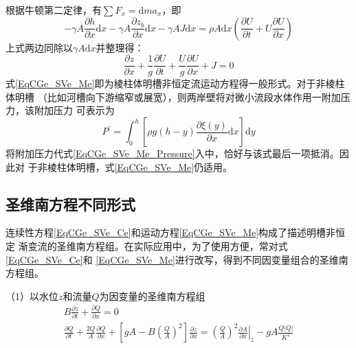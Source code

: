 根据牛顿第二定律，有$\sum F_{x}=\mathrm{d}ma_{x}$，即
\begin{equation}
  -\gamma A\frac{\partial h}{\partial x}\mathrm{d}x
  -\gamma A\frac{\partial z_{b}}{\partial x}\mathrm{d}x
  -\gamma AJ\mathrm{d}x
  =
  \rho A\mathrm{d}x
  \left(
  \frac{\partial U}{\partial t}
  +
  U
  \frac{\partial U}{\partial x}
  \right)
\end{equation}
上式两边同除以$\gamma A\mathrm{d}x$并整理得：
\begin{equation}
  \frac{\partial z}{\partial x}
  +
  \frac{1}{g}
  \frac{\partial U}{\partial t}
  +
  \frac{U}{g}
  \frac{\partial U}{\partial x}
  +
  J
  =
  0
  \label{EqCGe_SVe_Me}
\end{equation}
式\eqref{EqCGe_SVe_Me}即为棱柱体明槽非恒定流运动方程得一般形式。对于非棱柱体明槽
（比如河槽向下游缩窄或展宽），则两岸壁将对微小流段水体作用一附加压力，该附加压力
可表示为
\begin{equation}
  P^{\prime}
  =
  \int_{0}^{h}\!
  \left[
    \rho g(h-y)
    \frac{\partial \xi(y)}{\partial x}
    \mathrm{d}x
  \right]
  \mathrm{d}y
\end{equation}
将附加压力代式\eqref{EqCGe_SVe_Me_Pressure}入中，恰好与该式最后一项抵消。因此对
于非棱柱体明槽，式\eqref{EqCGe_SVe_Me}仍适用。

\subsection{圣维南方程不同形式}
连续性方程\eqref{EqCGe_SVe_Ce}和运动方程\eqref{EqCGe_SVe_Me}构成了描述明槽非恒定
渐变流的圣维南方程组。在实际应用中，为了使用方便，常对式\eqref{EqCGe_SVe_Ce}和
\eqref{EqCGe_SVe_Me}进行改写，得到不同因变量组合的圣维南方程组。


（1）以水位$z$和流量$Q$为因变量的圣维南方程组
\begin{equation}
  \begin{gathered}
    B\frac{\partial z}{\partial t}
    +
    \frac{\partial Q}{\partial x}
    =
    0
    \\
    \frac{\partial Q}{\partial t}
    +
    \frac{2Q}{A}\frac{\partial Q}{\partial x}
    +
    \left[
      gA -
      B
      \left(
      \frac{Q}{A}
      \right)^{2}
    \right]
    \frac{\partial z}{\partial x}
    =
    \left(
    \frac{Q}{A}
    \right)^{2}
    \left.
    \frac{\partial A}{\partial x}
    \right|_{z}
    -
    gA\frac{Q|Q|}{K^{2}}
  \end{gathered}
  \label{EqCGe_SV_zQ}
\end{equation}

